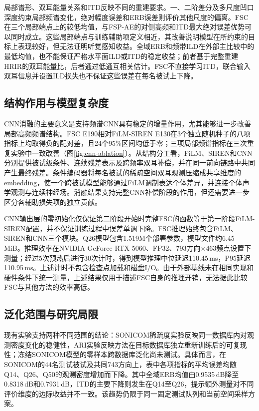 \documentclass[UTF8,a4paper]{article}
\begin{document}
局部谱形、双耳能量关系和ITD反映不同的重建要求。一、二阶差分及多尺度凹口深度约束局部频谱变化，绝对幅度误差和ERB误差则评价其他尺度的偏离。FSC在三个局部端点上的较低均值，与FSP-AE的对侧高频和ITD最大绝对误差优势可以同时成立。这些局部端点与训练辅助项定义相近，其改善说明模型在所约束的目标上表现较好，但无法证明听觉感知收益。全域ERB和频带ILD在外部主比较中的最低均值，也不能保证严格水平面ILD或ITD的稳定收益；前者基于完整重建HRIR的双耳能量比，后者通过低通互相关估计。FSC不直接学习ITD，联合输入双耳信息并设置ILD损失也不保证这些误差在每名被试上下降。

\subsection{结构作用与模型复杂度}
CNN消融的主要意义是支持频谱CNN具有稳定的增量作用，尤其能够进一步改善局部高频频谱结构。FSC E190相对FiLM-SIREN E130在3个独立随机种子的八项指标上均取得负的配对差，且24个95\%区间均低于零；三项局部频谱指标在三次重复实验中一致改善（图\ref{fig:cnn-ablation}）。从结构分工看，FiLM、SIREN和CNN分别提供被试级条件、连续残差表示及跨频率双耳补偿，并在同一前向链路中共同产生最终残差。条件编码器将每名被试的稀疏空间双耳观测压缩成共享维度的embedding，使一个跨被试模型能够通过FiLM调制表达个体差异，并连接个体声学观测与连续神经场。消融结果支持完整CNN补偿阶段的作用，但还需要进一步区分各辅助损失项的独立贡献。

CNN输出层的零初始化仅保证第二阶段开始时完整FSC的函数等于第一阶段FiLM-SIREN配置，并不保证训练过程中误差单调下降。FSC推理始终包含FiLM、SIREN和CNN三个模块。Q26模型包含1.519M个部署参数，模型文件约6.45\,MiB。推理效率在NVIDIA GeForce RTX 5060、FP32、793方向$\times$463频点设置下测量；经过5次预热后进行30次计时，得到模型推理中位延迟110.45\,ms，P95延迟110.95\,ms。上述计时不包含检查点加载和磁盘I/O。由于外部基线未在相同实现和硬件条件下统一测量，上述结果仅用于描述FSC自身的推理开销，无法据此比较FSC与其他方法的效率高低。

\subsection{泛化范围与研究局限}
现有实验支持两种不同范围的结论：SONICOM稀疏度实验反映同一数据库内对观测密度变化的稳健性，ARI实验反映方法在目标数据库独立重新训练后的可复现性；冻结SONICOM模型的零样本跨数据库泛化尚未测试。具体而言，在SONICOM的44名测试被试及共同743方向上，表中各项指标的平均误差均随Q14、Q26、Q50的观测密度增加而下降。其中全域ERB均值由0.9535\,dB降至0.8318\,dB和0.7931\,dB，ITD的主要下降则发生在Q14至Q26，提示额外测量对不同评价维度的边际收益并不一致。该趋势仍限于同一固定测试队列和当前空间采样方案。
\end{document}
